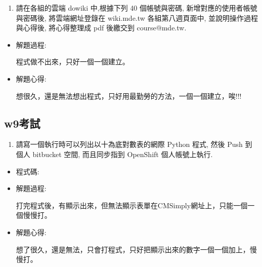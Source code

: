 \documentclass[]{article}
\newenvironment{Shaded}{}{}
\newcommand{\KeywordTok}[1]{\textcolor[rgb]{0.00,0.44,0.13}{\textbf{{#1}}}}
\newcommand{\DataTypeTok}[1]{\textcolor[rgb]{0.56,0.13,0.00}{{#1}}}
\newcommand{\DecValTok}[1]{\textcolor[rgb]{0.25,0.63,0.44}{{#1}}}
\newcommand{\CharTok}[1]{\textcolor[rgb]{0.25,0.44,0.63}{{#1}}}
\newcommand{\StringTok}[1]{\textcolor[rgb]{0.25,0.44,0.63}{{#1}}}
\newcommand{\OtherTok}[1]{\textcolor[rgb]{0.00,0.44,0.13}{{#1}}}
\newcommand{\NormalTok}[1]{{#1}}
\begin{document}
\begin{enumerate}
\def\labelenumi{\arabic{enumi}.}
\setcounter{enumi}{2}
\itemsep1pt\parskip0pt
\item
  請在各組的雲端 dowiki 中,根據下列 40 個帳號與密碼,
  新增對應的使用者帳號與密碼後, 將雲端網址登錄在 wiki.mde.tw
  各組第八週頁面中, 並說明操作過程與心得後, 將心得整理成 pdf 後繳交到
  course@mde.tw.
\end{enumerate}

\begin{itemize}
\item
  解題過程:

  程式做不出來，只好一個一個建立。
\item
  解題心得:

  想很久，還是無法想出程式，只好用最勤勞的方法，一個一個建立，唉!!!
\end{itemize}

\subsection{w9考試}\label{w9ux8003ux8a66}

\begin{enumerate}
\def\labelenumi{\arabic{enumi}.}
\itemsep1pt\parskip0pt
\item
  請寫一個執行時可以列出以十為底對數表的網際 Python 程式, 然後 Push
  到個人 bitbucket 空間, 而且同步指到 OpenShift 個人帳號上執行.
\end{enumerate}

\begin{itemize}
\item
  程式碼:

\begin{Shaded}
\end{Shaded}
\item
  解題過程:

  打完程式後，有顯示出來，但無法顯示表單在CMSimply網址上，只能一個一個慢慢打。
\item
  解題心得:

  想了很久，還是無法，只會打程式，只好把顯示出來的數字一個一個加上，慢慢打。
\end{itemize}
\end{document}
